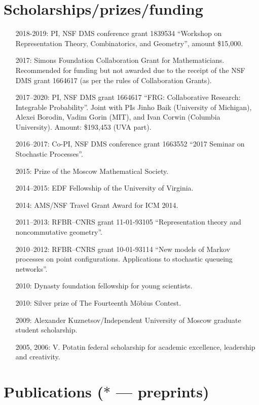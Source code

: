 \documentclass[letterpaper,11pt]{article}
\begin{document}
\section*{Scholarships/prizes/funding}
\begin{itemize}
	\item
		[2018-2019:] PI,
				NSF DMS conference grant 
				1839534
				``Workshop on Representation Theory, Combinatorics, and Geometry'',
				amount \$15,000.

		
	\item
	      [2017:] Simons Foundation Collaboration Grant for
	      Mathematicians. Recommended for funding but not awarded due to
	      the receipt of the NSF DMS grant 1664617 (as per the rules of Collaboration
	      Grants).
	\item
			[2017--2020:] PI, NSF DMS grant 1664617
	      ``FRG: Collaborative Research: Integrable Probability''.
	      Joint with PIs Jinho Baik (University of Michigan), Alexei
	      Borodin, Vadim Gorin (MIT), and Ivan Corwin (Columbia University). Amount:
	      \$193,453 (UVA part).
	\item
		[2016--2017:] Co-PI,
	      NSF DMS conference grant 1663552 ``2017 Seminar on Stochastic
				Processes''.
	\item
	      [2015:] Prize of the Moscow Mathematical Society.
	\item
	      [2014--2015:] EDF Fellowship of the University of Virginia.
	\item
	      [2014:] AMS/NSF Travel Grant Award for ICM 2014.
	\item
	      [2011--2013:] RFBR--CNRS grant 11-01-93105 ``Representation
	      theory and noncommutative geometry''.
	\item
	      [2010--2012:] RFBR--CNRS grant 10-01-93114 ``New models of
	      Markov processes on point configurations. Applications to
	      stochastic queueing networks''.
	\item
	      [2010:] Dynasty foundation fellowship for young scientists.
	\item
	      [2010:] Silver prize of The Fourteenth M\"obius Contest.
	\item
	      [2009:] Alexander Kuznetsov/Independent University of Moscow
	      graduate student scholarship.
	\item
	      [2005, 2006:] V. Potatin federal scholarship for academic
	      excellence, leadership and creativity.
\end{itemize}

\section*{Publications ($*$ --- preprints)}
\end{document}
